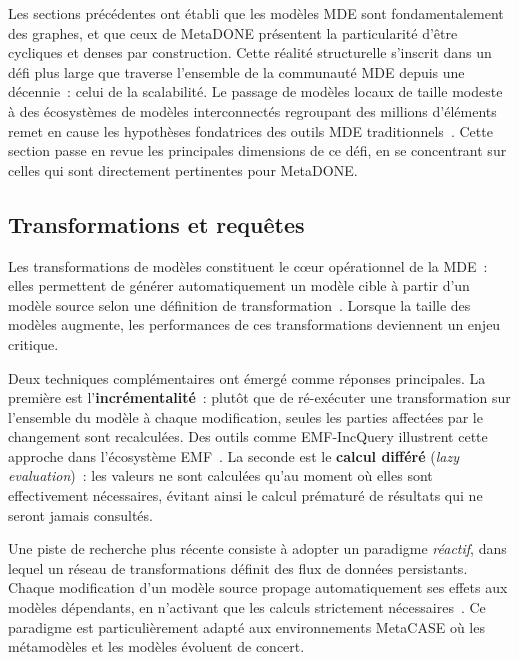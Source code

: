 Les sections précédentes ont établi que les modèles MDE sont fondamentalement des graphes, et que ceux de MetaDONE présentent la particularité d'être cycliques et denses par construction. Cette réalité structurelle s'inscrit dans un défi plus large que traverse l'ensemble de la communauté MDE depuis une décennie~: celui de la scalabilité. Le passage de modèles locaux de taille modeste à des écosystèmes de modèles interconnectés regroupant des millions d'éléments remet en cause les hypothèses fondatrices des outils MDE traditionnels~\cite{kolovos2013research}. Cette section passe en revue les principales dimensions de ce défi, en se concentrant sur celles qui sont directement pertinentes pour MetaDONE.

\subsection{Transformations et requêtes}
\label{sec:transfo-requetes}

Les transformations de modèles constituent le cœur opérationnel de la MDE~: elles permettent de générer automatiquement un modèle cible à partir d'un modèle source selon une définition de transformation~\cite{bezivin2005model}. Lorsque la taille des modèles augmente, les performances de ces transformations deviennent un enjeu critique.

Deux techniques complémentaires ont émergé comme réponses principales. La première est l'\textbf{incrémentalité}~: plutôt que de ré-exécuter une transformation sur l'ensemble du modèle à chaque modification, seules les parties affectées par le changement sont recalculées. Des outils comme EMF-IncQuery illustrent cette approche dans l'écosystème EMF~\cite{bergmann2010incremental}. La seconde est le \textbf{calcul différé} (\textit{lazy evaluation})~: les valeurs ne sont calculées qu'au moment où elles sont effectivement nécessaires, évitant ainsi le calcul prématuré de résultats qui ne seront jamais consultés.

Une piste de recherche plus récente consiste à adopter un paradigme \textit{réactif}, dans lequel un réseau de transformations définit des flux de données persistants. Chaque modification d'un modèle source propage automatiquement ses effets aux modèles dépendants, en n'activant que les calculs strictement nécessaires~\cite{cabot2012object}. Ce paradigme est particulièrement adapté aux environnements MetaCASE où les métamodèles et les modèles évoluent de concert.

